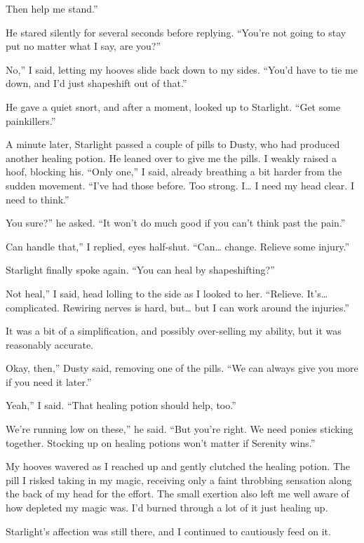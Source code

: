 \leavevmode{}Then help me stand.”

He stared silently for several seconds before replying. “You’re not going to stay put no matter what I say, are you?”

\leavevmode{}No,” I said, letting my hooves slide back down to my sides. “You’d have to tie me down, and I’d just shapeshift out of that.”

He gave a quiet snort, and after a moment, looked up to Starlight. “Get some painkillers.”

A minute later, Starlight passed a couple of pills to Dusty, who had produced another healing potion. He leaned over to give me the pills. I weakly raised a hoof, blocking his. “Only one,” I said, already breathing a bit harder from the sudden movement. “I’ve had those before. Too strong. I… I need my head clear. I need to think.”

\leavevmode{}You sure?” he asked. “It won’t do much good if you can’t think past the pain.”

\leavevmode{}Can handle that,” I replied, eyes half-shut. “Can… change. Relieve some injury.”

Starlight finally spoke again. “You can heal by shapeshifting?”

\leavevmode{}Not heal,” I said, head lolling to the side as I looked to her. “Relieve. It’s… complicated. Rewiring nerves is hard, but… but I can work around the injuries.”

It was a bit of a simplification, and possibly over-selling my ability, but it was reasonably accurate.

\leavevmode{}Okay, then,” Dusty said, removing one of the pills. “We can always give you more if you need it later.”

\leavevmode{}Yeah,” I said. “That healing potion should help, too.”

\leavevmode{}We’re running low on these,” he said. “But you’re right. We need ponies sticking together. Stocking up on healing potions won’t matter if Serenity wins.”

My hooves wavered as I reached up and gently clutched the healing potion. The pill I risked taking in my magic, receiving only a faint throbbing sensation along the back of my head for the effort. The small exertion also left me well aware of how depleted my magic was. I’d burned through a lot of it just healing up.

Starlight’s affection was still there, and I continued to cautiously feed on it.

